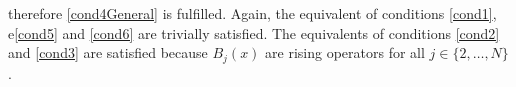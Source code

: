 \documentclass[11pt]{article}
\numberwithin{equation}{section}
\numberwithin{equation}{subsection}
\begin{document}
therefore \eqref{cond4General} is fulfilled. Again, the equivalent of conditions \eqref{cond1}, e\eqref{cond5} and \eqref{cond6} are trivially satisfied. The equivalents of conditions \eqref{cond2} and \eqref{cond3} are satisfied because $B_{j}(x)$ are rising operators for all $j\in \{2,\ldots,N\}$. 

\end{document}
